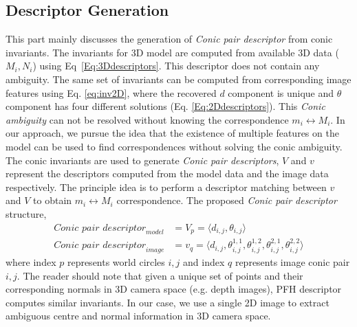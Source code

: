 \documentclass{bmvc2k}
\newcommand{\eref}[1]{Eq\bmvaOneDot~\ref{#1}}
\begin{document}
\subsection{Descriptor Generation}\label{ssec:descriptor}
This part mainly discusses the generation of \textit{Conic pair descriptor} from conic invariants. 
The invariants for 3D model are computed from available 3D data ($M_i,N_i$) using \eref{Eq:3Ddescriptors}. This descriptor does not contain any ambiguity.
The same set of invariants can be computed from corresponding image features using Eq. \ref{eq:inv2D}, where the recovered $ d $ component is unique and $ \theta $ component has four different solutions (Eq. \ref{Eq:2Ddescriptors}). 
This \textit{Conic ambiguity} can not be resolved without knowing the correspondence $ m_i \leftrightarrow M_i $.
In our approach, we pursue the idea that the existence of multiple features on the model can be used to find correspondences without solving the conic ambiguity. 
The conic invariants are used to generate \textit{Conic pair descriptors}, $ V $ and $ v $ represent the descriptors computed from the model data and the image data respectively.
The principle idea is to perform a descriptor matching between $ v $ and $ V $ to obtain $ m_i \leftrightarrow M_i $ correspondence.
The proposed \textit{Conic pair descriptor} structure,
\begin{align}
\textit{Conic pair descriptor}_{model} &= V_{p} = \langle d_{i,j},\theta_{i,j} \rangle \label{Eq:3Ddescriptors} \\
\textit{Conic pair descriptor}_{image} &= v_{q} = 
			\langle  d_{i,j},\theta_{i,j}^{1,1},\theta_{i,j}^{1,2},\theta_{i,j}^{2,1},\theta_{i,j}^{2,2} \rangle \label{Eq:2Ddescriptors} 
\end{align}
where index $p$ represents world circles $i,j$ and index $q$ represents image conic pair $i,j$.
The reader should note that given a unique set of points and their corresponding normals in 3D camera space (e.g. depth images), PFH descriptor \cite{RusuDoctoralDissertation} computes similar invariants.
In our case, we use a single 2D image to extract ambiguous centre and normal information in 3D camera space.  
\end{document}
